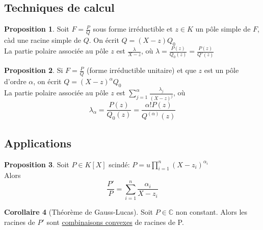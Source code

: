 \documentclass[10pt,a4paper]{article}
\theoremstyle{definition}
\newtheorem{proposition}{Proposition}[section]
\newtheorem{corollaire}[proposition]{Corollaire}
\begin{document}
\subsection{Techniques de calcul}
\begin{proposition}
Soit $F = \frac{P}{Q}$ sous forme irréductible et $z \in K$ un pôle simple de $F$, càd une racine simple de $Q$. On écrit $Q = (X - z) Q_0$ \\
La partie polaire associée au pôle $z$ est $\frac{\lambda}{X - z}$, où $\lambda = \frac{P(z)}{Q_0(z)} = \frac{P(z)}{Q'(z)}$
\end{proposition}
\begin{proposition}
Si $F = \frac{P}{Q}$ (forme irréductible unitaire) et que $z$ est un pôle d'ordre $\alpha$, on écrit $Q = (X - z)^\alpha Q_0$ \\
La partie polaire associée au pôle $z$ est $\sum\limits_{j = 1}^\alpha \frac{\lambda_j}{(X - z)^j}$, où
\[\lambda_\alpha = \frac{P(z)}{Q_0(z)} = \frac{\alpha! P(z)}{Q^{(\alpha)}(z)}\]
\end{proposition}

\subsection{Applications}
\begin{proposition}
Soit $P \in K[X]$ scindé: $P = u \prod\limits_{i = 1}^n (X - z_i)^{\alpha_i}$ \\
Alors
\[\frac{P'}{P} = \sum\limits_{i = 1}^n \frac{\alpha_i}{X - z_i}\]
\end{proposition}
\begin{corollaire}[Théorème de Gauss-Lucas]
Soit $P \in \mathbb{C}$ non constant. Alors les racines de $P'$ sont \uline{combinaisons convexes} de racines de P.
\end{corollaire}
\end{document}
